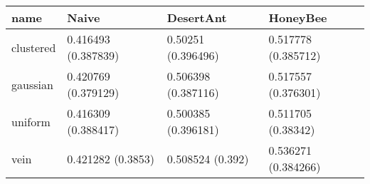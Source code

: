 \begin{tabular} {|l|l|l|l|}
\hline
name & Naive & DesertAnt & HoneyBee \\
\hline
clustered & 0.416493 (0.387839)  & 0.50251 (0.396496)  & 0.517778 (0.385712)  \\
gaussian & 0.420769 (0.379129)  & 0.506398 (0.387116)  & 0.517557 (0.376301)  \\
uniform & 0.416309 (0.388417)  & 0.500385 (0.396181)  & 0.511705 (0.38342)  \\
vein & 0.421282 (0.3853)  & 0.508524 (0.392)  & 0.536271 (0.384266)  \\
\hline
\end{tabular}
